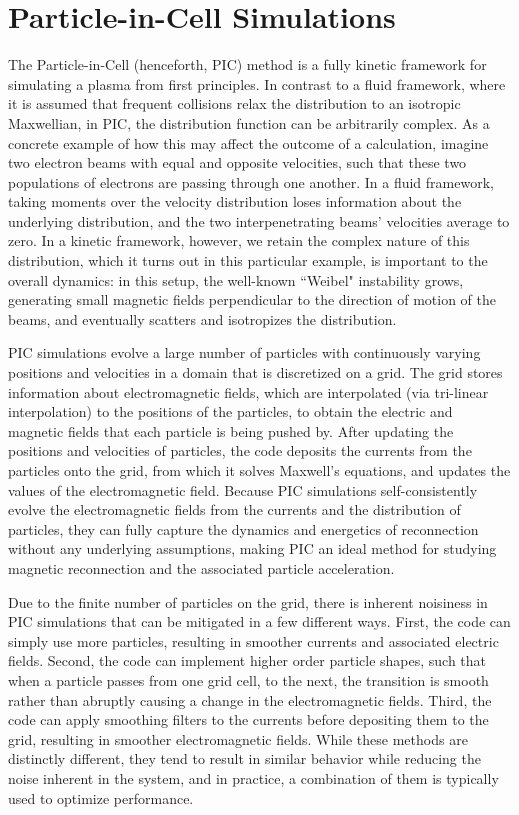 \section{Particle-in-Cell Simulations}
The Particle-in-Cell (henceforth, PIC) method is a fully kinetic framework for simulating a plasma from first principles.  In contrast to a fluid framework, where it is assumed that frequent collisions relax the distribution to an isotropic Maxwellian, in PIC, the distribution function can be arbitrarily complex.  As a concrete example of how this may affect the outcome of a calculation, imagine two electron beams with equal and opposite velocities, such that these two populations of electrons are passing through one another.  In a fluid framework, taking moments over the velocity distribution loses information about the underlying distribution, and the two interpenetrating beams' velocities average to zero.  In a kinetic framework, however, we retain the complex nature of this distribution, which it turns out in this particular example, is important to the overall dynamics: in this setup, the well-known ``Weibel" instability grows, generating small magnetic fields perpendicular to the direction of motion of the beams, and eventually scatters and isotropizes the distribution.  

PIC simulations evolve a large number of particles with continuously varying positions and velocities in a domain that is discretized on a grid.  The grid stores information about electromagnetic fields, which are interpolated (via tri-linear interpolation) to the positions of the particles, to obtain the electric and magnetic fields that each particle is being pushed by.  After updating the positions and velocities of particles, the code deposits the currents from the particles onto the grid, from which it solves Maxwell's equations, and updates the values of the electromagnetic field.  Because PIC simulations self-consistently evolve the electromagnetic fields from the currents and the distribution of particles, they can fully capture the dynamics and energetics of reconnection without any underlying assumptions, making PIC an ideal method for studying magnetic reconnection and the associated particle acceleration.

Due to the finite number of particles on the grid, there is inherent noisiness in PIC simulations that can be mitigated in a few different ways.  First, the code can simply use more particles, resulting in smoother currents and associated electric fields.  Second, the code can implement higher order particle shapes, such that when a particle passes from one grid cell, to the next, the transition is smooth rather than abruptly causing a change in the electromagnetic fields.  Third, the code can apply smoothing filters to the currents before depositing them to the grid, resulting in smoother electromagnetic fields.  While these methods are distinctly different, they tend to result in similar behavior while reducing the noise inherent in the system, and in practice, a combination of them is typically used to optimize performance.

